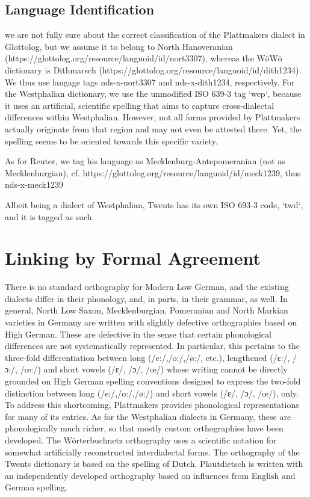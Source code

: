 \documentclass{article}
\begin{document}
\subsection{Language Identification}

we are not fully sure about the correct classification of the Plattmakers dialect in Glottolog, but we assume it to belong to North Hanoveranian (https://glottolog.org/resource/languoid/id/nort3307), whereas the WöWö dictionary is Dithmarsch (https://glottolog.org/resource/languoid/id/dith1234). We thus use langage tags nds-x-nort3307 and nds-x-dith1234, respectively. For the Westphalian dictionary, we use the unmodified ISO 639-3 tag `wep`, because it uses an artificial, scientific spelling that aims to capture cross-dialectal differences within Westphalian.
However, not all forms provided by Plattmakers actually originate from that region and may not even be attested there. Yet, the spelling seems to be oriented towards this specific variety.

As for Reuter, we tag his language as Mecklenburg-Antepomeranian (not as Mecklenburgian), cf. https://glottolog.org/resource/languoid/id/meck1239, thus nds-x-meck1239

Albeit being a dialect of Westphalian, Twents has its own ISO 693-3 code, `twd`, and it is tagged as such.


\section{Linking by Formal Agreement}
\label{sec-linking-by-agreement}

There is no standard orthography for Modern Low German, and the existing dialects differ in their phonology, and, in parts, in their grammar, as well.
In general, North Low Saxon, Mecklenburgian, Pomeranian and North Markian varieties in Germany are written with slightly defective orthographies based on High German. These are defective in the sense that certain phonological differences are not systematically represented. In particular, this pertains to the three-fold differentiation between long (/e:/,/o:/,/ø:/, etc.), lengthened (/ɛ:/, /ɔ:/, /œ:/) and short vowels (/ɛ/, /ɔ/, /œ/) whose writing cannot be directly grounded on High German spelling conventions designed to express the two-fold distinction between long (/e:/,/o:/,/ø:/) and short vowels (/ɛ/, /ɔ/, /œ/), only. 
To address this shortcoming, Plattmakers provides phonological representations for many of its entries. As for the Westphalian dialects in Germany, these are phonologically much richer, so that mostly custom orthographies have been developed. The Wörterbuchnetz orthography uses a scientific notation for somewhat artificially reconstructed interdialectal forms. The orthography of the Twents dictionary is based on the spelling of Dutch. Plautdietsch is written with an independently developed orthography based on influences from English and German spelling.
\end{document}

